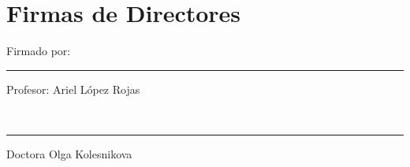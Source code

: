 \documentclass[12pt, a4paper, titlepage]{report}
\begin{document}
\newpage
\section*{Firmas de Directores}

\vfill  %
\noindent 
\parbox[b]{0.4\linewidth}{%
	\strut 
	Firmado por: \\[3cm]%
	\hrule
	Profesor: Ariel López Rojas} 
\hspace{1cm} %
\parbox[b]{0.4\linewidth}{%
	\strut 
	\\[3cm]%
	\hrule
	Doctora Olga Kolesnikova} 
\par\vspace{1cm} 
\newpage
\end{document}

